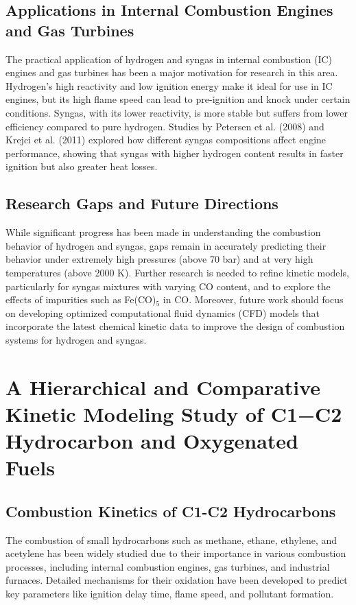 \documentclass[12pt]{report}
\begin{document}
\subsection{Applications in Internal Combustion Engines and Gas Turbines}
The practical application of hydrogen and syngas in internal combustion (IC) engines and gas turbines has been a major motivation for research in this area. Hydrogen’s high reactivity and low ignition energy make it ideal for use in IC engines, but its high flame speed can lead to pre-ignition and knock under certain conditions. Syngas, with its lower reactivity, is more stable but suffers from lower efficiency compared to pure hydrogen. Studies by Petersen et al. (2008) and Krejci et al. (2011) explored how different syngas compositions affect engine performance, showing that syngas with higher hydrogen content results in faster ignition but also greater heat losses.

\subsection{Research Gaps and Future Directions}
While significant progress has been made in understanding the combustion behavior of hydrogen and syngas, gaps remain in accurately predicting their behavior under extremely high pressures (above 70 bar) and at very high temperatures (above 2000 K). Further research is needed to refine kinetic models, particularly for syngas mixtures with varying CO content, and to explore the effects of impurities such as Fe(CO)$_5$ in CO. Moreover, future work should focus on developing optimized computational fluid dynamics (CFD) models that incorporate the latest chemical kinetic data to improve the design of combustion systems for hydrogen and syngas.

\section{A Hierarchical and Comparative Kinetic Modeling Study of C1−C2 Hydrocarbon and Oxygenated Fuels}

\subsection{Combustion Kinetics of C1-C2 Hydrocarbons}
The combustion of small hydrocarbons such as methane, ethane, ethylene, and acetylene has been widely studied due to their importance in various combustion processes, including internal combustion engines, gas turbines, and industrial furnaces. Detailed mechanisms for their oxidation have been developed to predict key parameters like ignition delay time, flame speed, and pollutant formation.
\end{document}
